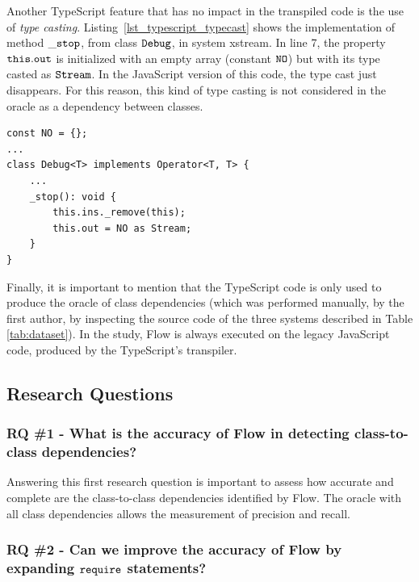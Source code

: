 \documentclass[review]{elsarticle}
\newcommand{\mcode}[1]{$\tt #1$}
\begin{document}
Another TypeScript feature that has no impact in the transpiled code is the use of \textit{type casting}. Listing~\ref{lst_typescript_typecast} shows the implementation of method \mcode{\_stop}, from class \mcode{Debug}, in system {\sc xstream}. In line 7, the property \mcode{this.out} is initialized with an empty array (constant \mcode{NO}) but with its type casted as \mcode{Stream}. In the JavaScript version of this code, the type cast just disappears. For this reason, this kind of type casting is not considered in the oracle as a dependency between classes.

\vspace{1.5 mm}

\begin{lstlisting}[caption=Example of type casting in TypeScript, label=lst_typescript_typecast, basicstyle=\ttfamily\footnotesize, emph={[2]NO,as,Stream},emphstyle={[2]\ttfamily\bfseries\color{darkgreen}}]
const NO = {};
...
class Debug<T> implements Operator<T, T> {
	...
	_stop(): void {
		this.ins._remove(this);
		this.out = NO as Stream;
	}
}  
\end{lstlisting} 


Finally, it is important to mention that the TypeScript code is only used to produce the oracle of class dependencies (which was performed manually, by the first author, by inspecting the source code of the three systems described in Table \ref{tab:dataset}). In the study, Flow is always executed on the legacy JavaScript code, produced by the TypeScript's transpiler.

\vspace{2.5 mm}

\subsection{Research Questions}
\label{sec:rqs}

\subsubsection*{RQ \#1 - What is the accuracy of Flow in detecting class-to-class dependencies?}
\label{sec:rq1-accuracy}

Answering this first research question is important to assess how accurate and complete are the class-to-class dependencies identified by Flow. The oracle with all class dependencies allows the measurement of precision and recall.

\subsubsection*{RQ \#2 - Can we improve the accuracy of Flow by expanding \mcode{require} statements?}
\label{sec:rq3-rename}
\end{document}
